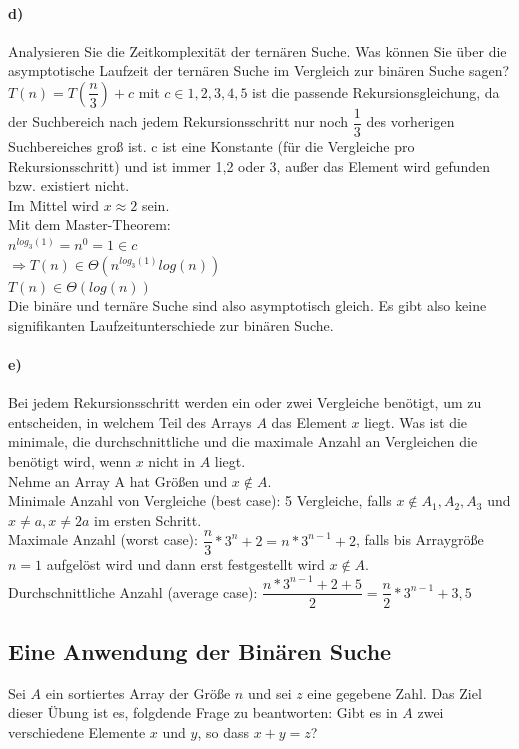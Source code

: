 \documentclass[paper=a4, fontsize=11pt]{scrartcl}
\numberwithin{equation}{section}
\numberwithin{figure}{section}
\numberwithin{table}{section}
\begin{document}
\paragraph{d)}
Analysieren Sie die Zeitkomplexität der ternären Suche. Was können Sie über die asymptotische Laufzeit der ternären Suche im Vergleich zur binären Suche sagen? \\

$T(n)=T( \dfrac{n}{3})+c$ mit $c \in {1,2,3,4,5}$ ist die passende Rekursionsgleichung, da der Suchbereich nach jedem Rekursionsschritt nur noch $\dfrac{1}{3}$ des vorherigen Suchbereiches groß ist. c ist eine Konstante (für die Vergleiche pro Rekursionsschritt) und ist immer 1,2 oder 3, außer das Element wird gefunden bzw. existiert nicht. \\
Im Mittel wird $x \approx 2$ sein. \\
Mit dem Master-Theorem: \\
$n^{log_{3}(1)} = n^{0} = 1 \in c$ \\
$\Rightarrow T(n) \in \Theta (n^{log_{3}(1)} log(n)) $ \\
$T(n) \in \Theta(log (n))$ \\
Die binäre und ternäre Suche sind also asymptotisch gleich. Es gibt also keine signifikanten Laufzeitunterschiede zur binären Suche.

\paragraph{e)}
Bei jedem Rekursionsschritt werden ein oder zwei Vergleiche benötigt, um zu entscheiden, in welchem Teil des Arrays $A$ das Element $x$ liegt. Was ist die minimale, die durchschnittliche und die maximale Anzahl an Vergleichen die benötigt wird, wenn $x$ nicht in $A$ liegt. \\

Nehme an Array A hat Größen und $x \notin A$. \\
Minimale Anzahl von Vergleiche (best case): 5 Vergleiche, falls $x \notin A_{1},A_{2},A_{3}$ und $x \neq a, x\neq 2a$ im ersten Schritt. \\
Maximale Anzahl (worst case): $\dfrac{n}{3} * 3^{n}+2 = n * 3^{n-1}+2$, falls bis Arraygröße $n=1$ aufgelöst wird und dann erst festgestellt wird $x \notin A$. \\
Durchschnittliche Anzahl (average case): $\dfrac{n*3^{n-1}+2+5}{2} = \dfrac{n}{2} *3^{n-1}+3,5$

\subsection{Eine Anwendung der Binären Suche}
Sei $A$ ein sortiertes Array der Größe $n$ und sei $z$ eine gegebene Zahl. Das Ziel dieser Übung ist es, folgdende Frage zu beantworten: Gibt es in $A$ zwei verschiedene Elemente $x$ und $y$, so dass $x+y=z$?
\end{document}
